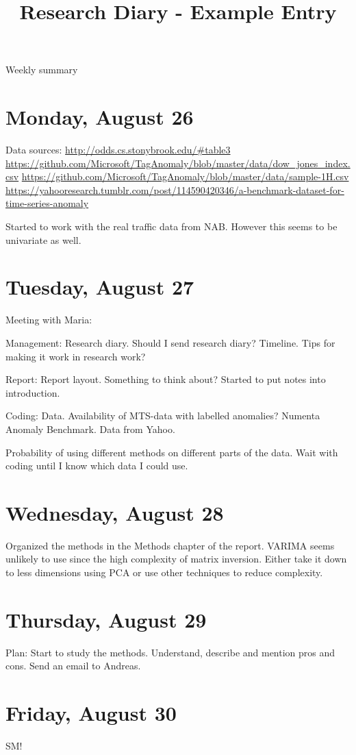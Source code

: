 \documentclass[11pt,letterpaper]{article}
\begin{document}
\univlogo

\title{Research Diary - Example Entry}

{\Huge Weekly summary}\\[5mm]

\section*{Monday, August 26}

Data sources: \newline
\url{http://odds.cs.stonybrook.edu/#table3}
\url{https://github.com/Microsoft/TagAnomaly/blob/master/data/dow_jones_index.csv}
\url{https://github.com/Microsoft/TagAnomaly/blob/master/data/sample-1H.csv}
\url{https://yahooresearch.tumblr.com/post/114590420346/a-benchmark-dataset-for-time-series-anomaly}

Started to work with the real traffic data from NAB. However this seems to be univariate as well.

\section*{Tuesday, August 27}

Meeting with Maria:

Management:
Research diary. Should I send research diary?
Timeline. Tips for making it work in research work?

Report:
Report layout. Something to think about?
Started to put notes into introduction.

Coding:
Data. Availability of MTS-data with labelled anomalies?
Numenta Anomaly Benchmark.
Data from Yahoo.

Probability of using different methods on different parts of the data. Wait with coding until I know which data I could use.

\section*{Wednesday, August 28}

Organized the methods in the Methods chapter of the report. VARIMA seems unlikely to use since the high complexity of matrix inversion. Either take it down to less dimensions using PCA or use other techniques to reduce complexity.

\section*{Thursday, August 29}

Plan:
Start to study the methods. Understand, describe and mention pros and cons.
Send an email to Andreas.

\section*{Friday, August 30}
SM!

\printbibliography
\end{document}
